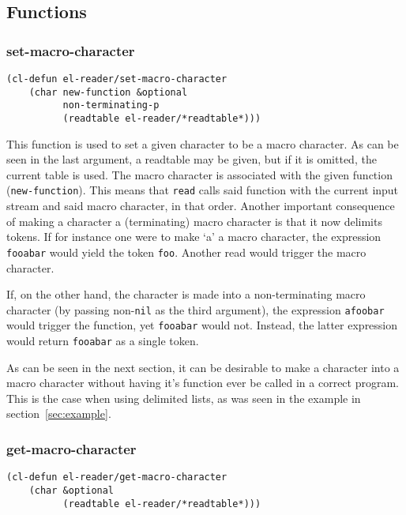 \documentclass[a4paper,10pt,twoside]{report}
\newcommand{\sym}[1]{\texttt{#1}}
\newcommand{\fun}[1]{\texttt{#1}}
\newcommand{\Read}{\fun{read}}
\newcommand{\nil}{\sym{nil}}
\begin{document}
\subsection{Functions}
\label{subsec:functions}

\subsubsection{set-macro-character}
\label{subsubsec:set-macro-character}

\begin{lstlisting}[style=lispinline]
(cl-defun el-reader/set-macro-character
    (char new-function &optional
          non-terminating-p
          (readtable el-reader/*readtable*)))
\end{lstlisting}

This function is used to set a given character to be a macro character.  As can
be seen in the last argument, a readtable may be given, but if it is omitted,
the current table is used.  The macro character is associated with the given
function (\sym{new-function}).  This means that \Read{} calls said function with
the current input stream and said macro character, in that order.  Another
important consequence of making a character a (terminating) macro character is
that it now delimits tokens.  If for instance one were to make `a' a macro
character, the expression \texttt{fooabar} would yield the token \texttt{foo}.
Another read would trigger the macro character.

If, on the other hand, the character is made into a non-terminating macro
character (by passing non-\nil{} as the third argument), the expression
\texttt{afoobar} would trigger the function, yet \texttt{fooabar} would not.
Instead, the latter expression would return \texttt{fooabar} as a single token.

As can be seen in the next section, it can be desirable to make a character into
a macro character without having it’s function ever be called in a correct
program.  This is the case when using delimited lists, as was seen in the
example in section~\ref{sec:example}.

\subsubsection{get-macro-character}
\label{subsubsec:get-macro-character}

\begin{lstlisting}[style=lispinline]
(cl-defun el-reader/get-macro-character
    (char &optional
          (readtable el-reader/*readtable*)))
\end{lstlisting}
\end{document}

